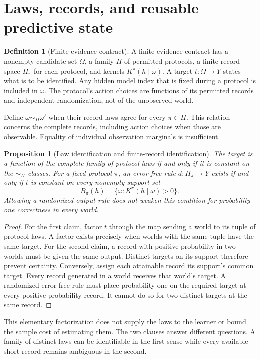 \documentclass[11pt,letterpaper]{article}
\theoremstyle{plain}
\newtheorem{proposition}[theorem]{Proposition}
\theoremstyle{definition}
\newtheorem{definition}[theorem]{Definition}
\begin{document}
\section{Laws, records, and reusable predictive state}\label{sec:grounding}
\begin{definition}[Finite evidence contract]\label{def:evidence}
A finite evidence contract has a nonempty candidate set $\Omega$, a family $\Pi$ of permitted protocols, a finite record space $H_\pi$ for each protocol, and kernels $K^\pi(h\mid\omega)$. A target $t:\Omega\to Y$ states what is to be identified. Any hidden model index that is fixed during a protocol is included in $\omega$. The protocol's action choices are functions of its permitted records and independent randomization, not of the unobserved world.
\end{definition}

Define $\omega\sim_\Pi\omega'$ when their record laws agree for every $\pi\in\Pi$. This relation concerns the complete records, including action choices when those are observable. Equality of individual observation marginals is insufficient.

\begin{proposition}[Law identification and finite-record identification]\label{prop:law}
The target is a function of the complete family of protocol laws if and only if it is constant on the $\sim_\Pi$ classes. For a fixed protocol $\pi$, an error-free rule $d:H_\pi\to Y$ exists if and only if $t$ is constant on every nonempty support set
\[
B_\pi(h)=\{\omega:K^\pi(h\mid\omega)>0\}.
\]
Allowing a randomized output rule does not weaken this condition for probability-one correctness in every world.
\end{proposition}
\begin{proof}
For the first claim, factor $t$ through the map sending a world to its tuple of protocol laws. A factor exists precisely when worlds with the same tuple have the same target. For the second claim, a record with positive probability in two worlds must be given the same output. Distinct targets on its support therefore prevent certainty. Conversely, assign each attainable record its support's common target. Every record generated in a world receives that world's target. A randomized error-free rule must place probability one on the required target at every positive-probability record. It cannot do so for two distinct targets at the same record.
\end{proof}

This elementary factorization does not supply the laws to the learner or bound the sample cost of estimating them. The two clauses answer different questions. A family of distinct laws can be identifiable in the first sense while every available short record remains ambiguous in the second.
\end{document}
